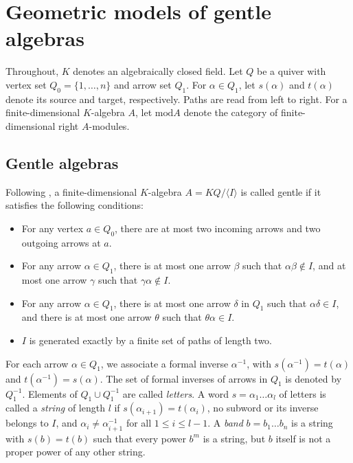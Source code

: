 \documentclass[a4paper,10pt]{amsart}
\theoremstyle{plain}          %
\theoremstyle{definition}
\newcommand{\mmod}{\mathrm{mod}}
\begin{document}
\section{Geometric models of gentle algebras}\label{s: gentle algebra}
Throughout, $K$ denotes an algebraically closed field. Let $Q$ be a quiver with vertex set $Q_0=\{1,\dots,n\}$ and arrow set $Q_1$. For $\alpha\in Q_1$, let $s(\alpha)$ and $t(\alpha)$ denote its source and target, respectively. Paths are read from left to right. For a finite-dimensional $K$-algebra $A$, let $\mmod A$ denote the category of finite-dimensional right $A$-modules.
\subsection{Gentle algebras}
Following \cite{AS87}, a finite-dimensional $K$-algebra $A=KQ/\langle I\rangle$ is called gentle if it satisfies the following conditions:
    \begin{itemize}
        \item [(G1)] For any vertex $a\in Q_0$, there are at most two incoming arrows and two outgoing arrows at $a$.
        \item [(G2)]For any arrow $\alpha\in Q_1$, there is at most one arrow $\beta$ such that $\alpha\beta\notin I$, and at most one arrow $\gamma$ such that $\gamma\alpha\notin I$.
        \item[(G3)] For any arrow $\alpha\in Q_1$, there is at most one arrow $\delta$ in $Q_1$ such that $\alpha\delta\in I$, and there is at most one arrow $\theta$ such that $\theta\alpha\in I$.
 	    \item [(G4)] $I$ is generated exactly by a finite set of paths of length two.
  \end{itemize}
    For each arrow $\alpha \in Q_1$, we associate a formal inverse $\alpha^{-1}$, with $s(\alpha^{-1})=t(\alpha)$ and $t(\alpha^{-1}) = s(\alpha)$. The set of formal inverses of arrows in $Q_1$ is denoted by $Q_1^{-1}$. Elements of $Q_1\cup Q_1^{-1}$ are called \emph{letters}.
A word $s=\alpha_1\dots \alpha_l$ of letters is called a \textit{string} of length $l$ if $s(\alpha_{i+1})=t(\alpha_{i})$, no subword or its inverse belongs to $I$, and $\alpha_i\neq \alpha_{i+1}^{-1}$ for all $1\leq i\leq l-1$.
A \emph{band} $b=b_1\dots b_n$ is a string with $s(b)=t(b)$ such that every power $b^m$ is a string, but $b$ itself is not a proper power of any other string.
 
\end{document}

